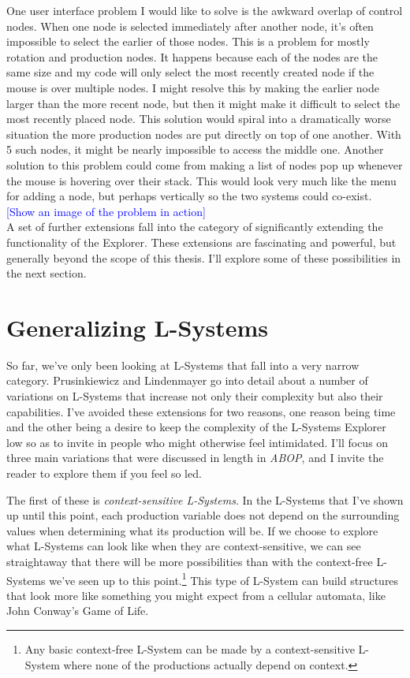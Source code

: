 \documentclass[12pt,twoside]{reedthesis}
\begin{document}
	One user interface problem I would like to solve is the awkward overlap of control nodes. When one node is selected immediately after another node, it's often impossible to select the earlier of those nodes. This is a problem for mostly rotation and production nodes. It happens because each of the nodes are the same size and my code will only select the most recently created node if the mouse is over multiple nodes. I might resolve this by making the earlier node larger than the more recent node, but then it might make it difficult to select the most recently placed node. This solution would spiral into a dramatically worse situation the more production nodes are put directly on top of one another. With 5 such nodes, it might be nearly impossible to access the middle one. Another solution to this problem could come from making a list of nodes pop up whenever the mouse is hovering over their stack. This would look very much like the menu for adding a node, but perhaps vertically so the two systems could co-exist.\\
	
	\textcolor{blue}{[Show an image of the problem in action]}\\
	
	A set of further extensions fall into the category of significantly extending the functionality of the Explorer. These extensions are fascinating and powerful, but generally beyond the scope of this thesis. I'll explore some of these possibilities in the next section.

\section{Generalizing L-Systems}
\label{Generalizations}

So far, we've only been looking at L-Systems that fall into a very narrow category. Prusinkiewicz and Lindenmayer go into detail about a number of variations on L-Systems that increase not only their complexity but also their capabilities. I've avoided these extensions for two reasons, one reason being time and the other being a desire to keep the complexity of the L-Systems Explorer low so as to invite in people who might otherwise feel intimidated. I'll focus on three main variations that were discussed in length in \textit{ABOP}, and I invite the reader to explore them if you feel so led.

	The first of these is \textit{context-sensitive L-Systems}. In the L-Systems that I've shown up until this point, each production variable does not depend on the surrounding values when determining what its production will be. If we choose to explore what L-Systems can look like when they are context-sensitive, we can see straightaway that there will be more possibilities than with the context-free L-Systems we've seen up to this point.\footnote{Any basic context-free L-System can be made by a context-sensitive L-System where none of the productions actually depend on context.} This type of L-System can build structures that look more like something you might expect from a cellular automata, like John Conway's Game of Life.\\
	
\end{document}
